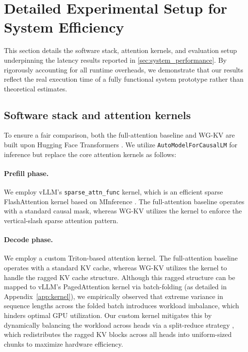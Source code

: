\section{Detailed Experimental Setup for System Efficiency}
\label{app:system}

This section details the software stack, attention kernels, and evaluation setup underpinning the latency results reported in \cref{sec:system_performance}. By rigorously accounting for all runtime overheads, we demonstrate that our results reflect the real execution time of a fully functional system prototype rather than theoretical estimates.

\subsection{Software stack and attention kernels}
To ensure a fair comparison, both the full-attention baseline and WG-KV are built upon Hugging Face Transformers \cite{transformers}. We utilize \texttt{AutoModelForCausalLM} for inference but replace the core attention kernels as follows:

\paragraph{Prefill phase.} We employ vLLM's \texttt{sparse\_attn\_func} kernel, which is an efficient sparse FlashAttention kernel based on MInference \cite{minference}. The full-attention baseline operates with a standard causal mask, whereas WG-KV utilizes the kernel to enforce the vertical-slash sparse attention pattern.

\paragraph{Decode phase.} We employ a custom Triton-based \cite{triton} attention kernel. The full-attention baseline operates with a standard KV cache, whereas WG-KV utilizes the kernel to handle the ragged KV cache structure. Although this ragged structure can be mapped to vLLM's PagedAttention \cite{pagedattn} kernel via batch-folding (as detailed in Appendix~\ref{app:kernel}), we empirically observed that extreme variance in sequence lengths across the folded batch introduces workload imbalance, which hinders optimal GPU utilization. Our custom kernel mitigates this by dynamically balancing the workload across heads via a split-reduce strategy \cite{flashdecoding}, which redistributes the ragged KV blocks across all heads into uniform-sized chunks to maximize hardware efficiency.

